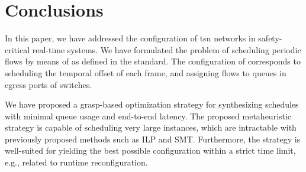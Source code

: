 \section{Conclusions}
In this paper, we have addressed the configuration of \gls{tsn} networks in safety-critical real-time systems.
We have formulated the problem of scheduling periodic  flows by means of  as defined in the  standard.
The configuration of  corresponds to scheduling the temporal offset of each frame, and assigning flows to queues in egress ports of switches.

We have proposed a \gls{grasp}-based optimization strategy for synthesizing schedules with minimal queue usage and end-to-end latency.
The proposed metaheuristic strategy is capable of scheduling very large instances, which are intractable with previously proposed methods such as ILP and SMT. Furthermore, the strategy is well-suited for yielding the best possible configuration within a strict time limit, e.g., related to runtime reconfiguration.


